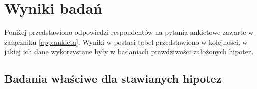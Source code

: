 \documentclass[a4paper,12pt,twoside,openright]{mwrep}
\begin{document}
\chapter*{Wyniki badań}

	Poniżej przedstawiono odpowiedzi respondentów na pytania ankietowe zawarte w załączniku \ref{app:ankieta}. Wyniki w postaci tabel przedstawiono w kolejności, w jakiej ich dane wykorzystane były w badaniach prawdziwości założonych hipotez.
























































\section*{Badania właściwe dla stawianych hipotez}
\end{document}
